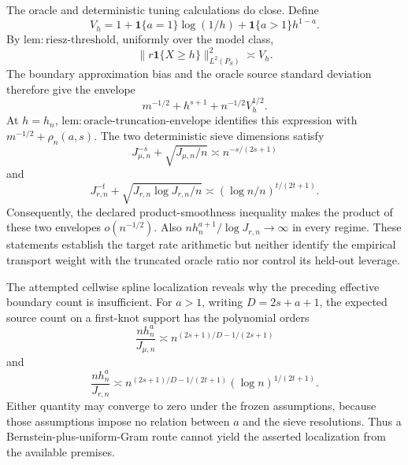 The oracle and deterministic tuning calculations do close. Define
\[
V_h=1+\mathbf 1\{a=1\}\log(1/h)+\mathbf 1\{a>1\}h^{1-a}.
\]
By \(\mathrm{lem:riesz\text{-}threshold}\), uniformly over the model class,
\[
\|r\mathbf 1\{X\ge h\}\|_{L^2(P_S)}^2\asymp V_h.
\]
The boundary approximation bias and the oracle source standard deviation therefore give the envelope
\[
m^{-1/2}+h^{s+1}+n^{-1/2}V_h^{1/2}.
\]
At \(h=h_n\), \(\mathrm{lem:oracle\text{-}truncation\text{-}envelope}\) identifies this expression with \(m^{-1/2}+\rho_n(a,s)\). The two deterministic sieve dimensions satisfy
\[
J_{\mu,n}^{-s}+\sqrt{J_{\mu,n}/n}\asymp n^{-s/(2s+1)}
\]
and
\[
J_{r,n}^{-t}+\sqrt{J_{r,n}\log J_{r,n}/n}\asymp(\log n/n)^{t/(2t+1)}.
\]
Consequently, the declared product-smoothness inequality makes the product of these two envelopes \(o(n^{-1/2})\). Also \(nh_n^{a+1}/\log J_{r,n}\to\infty\) in every regime. These statements establish the target rate arithmetic but neither identify the empirical transport weight with the truncated oracle ratio nor control its held-out leverage.

The attempted cellwise spline localization reveals why the preceding effective boundary count is insufficient. For \(a>1\), writing \(D=2s+a+1\), the expected source count on a first-knot support has the polynomial orders
\[
\frac{nh_n^a}{J_{\mu,n}}\asymp n^{(2s+1)/D-1/(2s+1)}
\]
and
\[
\frac{nh_n^a}{J_{r,n}}\asymp n^{(2s+1)/D-1/(2t+1)}(\log n)^{1/(2t+1)}.
\]
Either quantity may converge to zero under the frozen assumptions, because those assumptions impose no relation between \(a\) and the sieve resolutions. Thus a Bernstein-plus-uniform-Gram route cannot yield the asserted localization from the available premises.